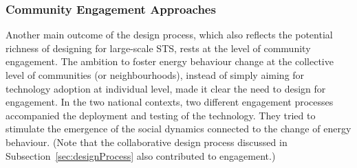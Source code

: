 

\subsubsection{Community Engagement Approaches} %

Another main outcome of the design process, which also reflects the potential richness of designing for large-scale STS, rests at the level of community engagement. %
The ambition to foster energy behaviour change at the collective level of communities (or neighbourhoods),
instead of simply aiming for technology adoption at individual level, made it clear the need to design for
engagement.
% 
In the two national contexts, two different engagement processes accompanied the deployment and testing of the technology. They tried to stimulate the emergence of the social dynamics connected to the change of energy behaviour. (Note that the collaborative design process discussed in Subsection~\ref{sec:designProcess} also contributed to engagement.)

